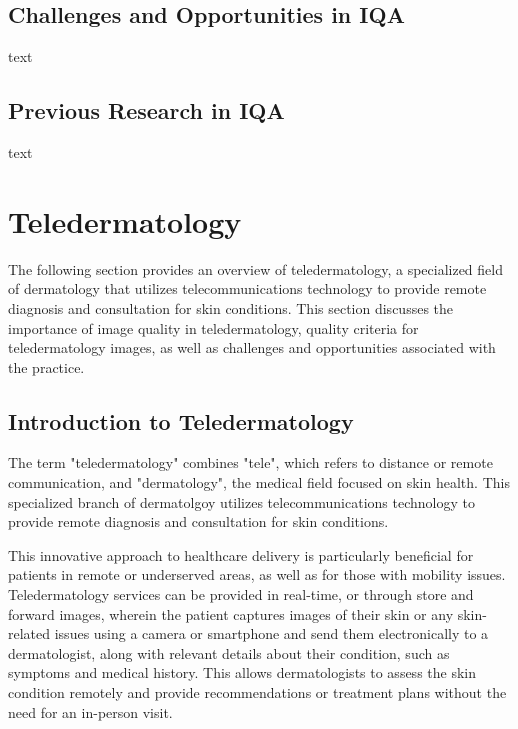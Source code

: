\subsection{Challenges and Opportunities in IQA}
\label{sub:ChallengesOpportunitiesIQA}
text \par
\vspace{\baselineskip}
\noindent

\subsection{Previous Research in IQA}
\label{sub:PreviousResearchIQA}
text \par
\vspace{\baselineskip}
\noindent



\section{Teledermatology}
\label{sec:Teledermatology}
The following section provides an overview of teledermatology, a specialized field of dermatology that utilizes telecommunications technology to provide remote diagnosis and consultation for skin conditions. This section discusses the importance of image quality in teledermatology, quality criteria for teledermatology images, as well as challenges and opportunities associated with the practice. \par
\vspace{\baselineskip}
\noindent

\subsection{Introduction to Teledermatology}
\label{sub:IntroductionTeledermatology}
The term "teledermatology" combines "tele", which refers to distance or remote communication, and "dermatology", the medical field focused on skin health. This specialized branch of dermatolgoy utilizes telecommunications technology to provide remote diagnosis and consultation for skin conditions.\par
\vspace{\baselineskip}
\noindent
This innovative approach to healthcare delivery is particularly beneficial for patients in remote or underserved areas, as well as for those with mobility issues. Teledermatology services can be provided in real-time, or through store and forward images, wherein the patient captures images of their skin or any skin-related issues using a camera or smartphone and send them electronically to a dermatologist, along with relevant details about their condition, such as symptoms and medical history. This allows dermatologists to assess the skin condition remotely and provide recommendations or treatment plans without the need for an in-person visit.\par

